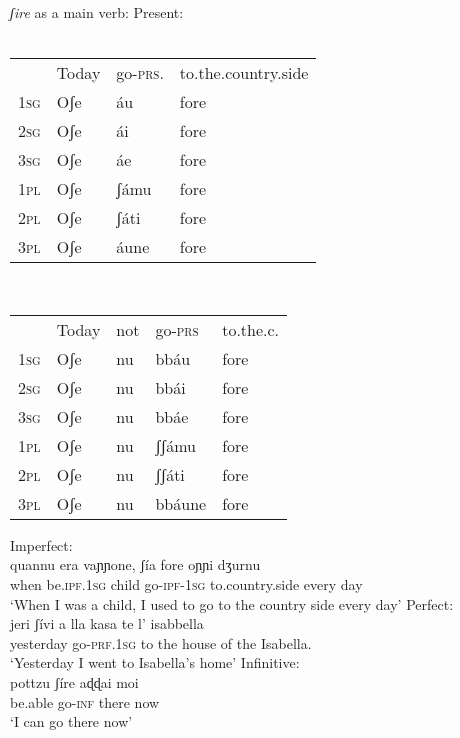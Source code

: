 \documentclass[output=paper]{langscibook}
\begin{document}
\ea \label{ac24}\textit{ʃire} as a main verb:
    \ea \label{ac24a}Present:\\
       \ea\label{ac24ai}~\\
            \begin{tabular}[t]{llll}
                & Today & go-\textsc{prs}. & to.the.country.side\\
            \textsc{1sg} & Oʃe   & áu      & fore\\
            \textsc{2sg} & Oʃe   & ái      & fore\\
            \textsc{3sg} & Oʃe   & áe      & fore\\
            \textsc{1pl} & Oʃe   & ʃámu    & fore\\
            \textsc{2pl} & Oʃe   & ʃáti    & fore\\
            \textsc{3pl} & Oʃe   & áune    & fore\\
            \end{tabular}
        \ex\label{ac24aii}~\\
        \begin{tabular}[t]{lllll}
         & Today & not     & go-\textsc{prs}              & to.the.c. \\
        \textsc{1sg} & Oʃe   & nu      & bbáu                & fore      \\
        \textsc{2sg} & Oʃe   & nu      & bbái                & fore      \\
        \textsc{3sg} & Oʃe   & nu      & bbáe                & fore      \\
        \textsc{1pl} & Oʃe   & nu      & ʃʃámu               & fore      \\
        \textsc{2pl} & Oʃe   & nu      & ʃʃáti               & fore      \\
        \textsc{3pl} & Oʃe   & nu      & bbáune              & fore
        \end{tabular}
        \z
    \ex \label{ac24b}Imperfect:\\
    \gll      quannu era    vaɲɲone, ʃía      fore    oɲɲi dʒurnu\\
     when be.\textsc{ipf}.\textsc{1sg} child  go-\textsc{ipf}-\textsc{1sg} to.country.side every day\\
     \glt ‘When I was a child, I used to go to the country side every day’
    \ex  \label{ac24c}Perfect: \\
    \gll jeri      ʃívi      a lla  kasa   te l’ isabbella\\
     yesterday  go-\textsc{prf}.\textsc{1sg} to the house of the Isabella.\\
    \glt ‘Yesterday I went to Isabella’s home’
    \ex \label{ac24d}Infinitive: \\
     \gll pottzu  ʃíre    aɖɖai  moi\\
     be.able go-\textsc{inf}  there now\\
     \glt ‘I can go there now’
    \z
\z
\end{document}
